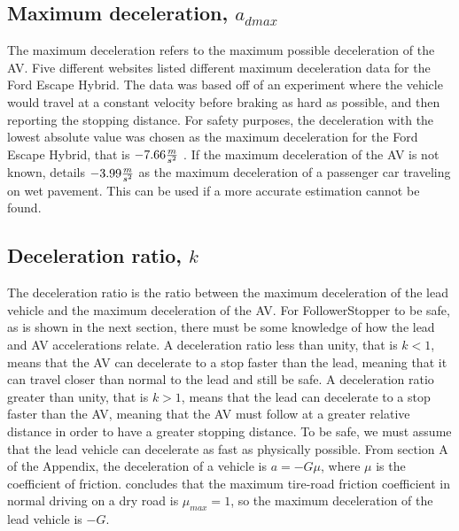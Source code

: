 \documentclass[conference]{IEEEtran}
\begin{document}
\subsection{Maximum deceleration, $a_{dmax}$}
The maximum deceleration refers to the maximum possible deceleration of the AV. Five different websites \cite{carsort,motortrend,caranddriver,edmunds,michigan} listed different maximum deceleration data for the Ford Escape Hybrid. The data was based off of an experiment where the vehicle would travel at a constant velocity before braking as hard as possible, and then reporting the stopping distance. For safety purposes, the deceleration with the lowest absolute value was chosen as the maximum deceleration for the Ford Escape Hybrid, that is $-7.66{m\over s^2}$ \cite{caranddriver}. If the maximum deceleration of the AV is not known, \cite{fambro1997nchrp} details $-3.99{m\over s^2}$ as the maximum deceleration of a passenger car traveling on wet pavement. This can be used if a more accurate estimation cannot be found.

\subsection{Deceleration ratio, $k$}
The deceleration ratio is the ratio between the maximum deceleration of the lead vehicle and the maximum deceleration of the AV. For FollowerStopper to be safe, as is shown in the next section, there must be some knowledge of how the lead and AV accelerations relate. A deceleration ratio less than unity, that is $k<1$, means that the AV can decelerate to a stop faster than the lead, meaning that it can travel closer than normal to the lead and still be safe. A deceleration ratio greater than unity, that is $k>1$, means that the lead can decelerate to a stop faster than the AV, meaning that the AV must follow at a greater relative distance in order to have a greater stopping distance. To be safe, we must assume that the lead vehicle can decelerate as fast as physically possible. From section A of the Appendix, the deceleration of a vehicle is $a=-G\mu$, where $\mu$ is the coefficient of friction. \cite{muller2003estimation} concludes that the maximum tire-road friction coefficient in normal driving on a dry road is $\mu_{max}=1$, so the maximum deceleration of the lead vehicle is $-G$.
\end{document}
